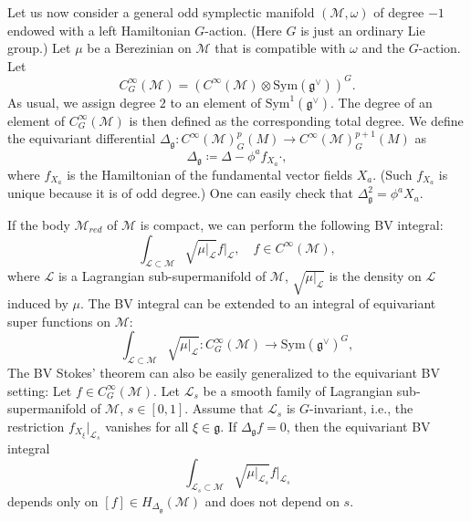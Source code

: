 \documentclass[12pt]{amsart}
\numberwithin{table}{section}
\numberwithin{equation}{section}
\theoremstyle{plain}
\newcommand{\sM}{\mathcal{M}}
\newcommand{\sL}{\mathcal{L}}
\newcommand{\Sym}{\mathrm{Sym}}
\begin{document}
Let us now consider a general odd symplectic manifold $(\sM, \omega)$ of degree $-1$ endowed with a left Hamiltonian $G$-action. (Here $G$ is just an ordinary Lie group.) Let $\mu$ be a Berezinian on $\sM$ that is compatible with $\omega$ and the $G$-action.  Let
\[
C^{\infty}_G(\sM) = (C^{\infty}(\sM) \otimes \Sym (\mathfrak{g}^{\vee}))^{G}.
\]
As usual, we assign degree $2$ to an element of $\Sym^1 (\mathfrak{g}^{\vee})$. The degree of an element of $C^{\infty}_G(\mathcal{M})$ is then defined as the corresponding total degree.
We define the equivariant differential $\Delta_{\mathfrak{g}}\colon C^{\infty}(\sM)^p_{G}(M) \rightarrow C^{\infty}(\sM)^{p+1}_{G}(M)$ as
\[
\Delta_{\mathfrak{g}}\coloneqq \Delta - \phi^a f_{X_a} \cdot,
\]
where $f_{X_a}$ is the Hamiltonian of the fundamental vector fields $X_a$. (Such $f_{X_a}$ is unique because it is of odd degree.) One can easily check that
$
\Delta_{\mathfrak{g}}^2 = \phi^a X_a.
$

If the body $\sM_{red}$ of $\sM$ is compact, we can perform the following BV integral:
\[
\int_{\sL \subset \sM} \sqrt{\mu|_{\sL}} f|_{\sL}, \quad f \in C^{\infty}(\sM),
\]
where $\sL$ is a Lagrangian sub-supermanifold of $\sM$, $\sqrt{\mu|_{\sL}}$ is the density on $\sL$ induced by $\mu$. The BV integral can be extended to an integral of equivariant super functions on $\sM$:
\[
\int_{\sL \subset \sM}  \sqrt{\mu|_{\sL}} \colon C^{\infty}_G(\sM)\rightarrow \Sym(\mathfrak{g}^{\vee})^G,
\]
The BV Stokes' theorem can also be easily generalized to the equivariant BV setting: Let $f \in C^{\infty}_G(\sM)$. Let $\sL_s$ be a smooth family of Lagrangian sub-supermanifold of $\sM$, $s \in [0,1]$. Assume that $\sL_s$ is $G$-invariant, i.e., the restriction $f_{X_{\xi}}|_{\sL_s}$ vanishes for all $\xi \in \mathfrak{g}$. If $\Delta_{\mathfrak{g}} f =0$, then the equivariant BV integral
\[
\int_{\sL_s \subset \sM} \sqrt{\mu|_{\sL_s}} f|_{\sL_s}
\]
depends only on $[f] \in H_{\Delta_{\mathfrak{g}}}(\mathcal{M})$ and does not depend on $s$.
\end{document}
